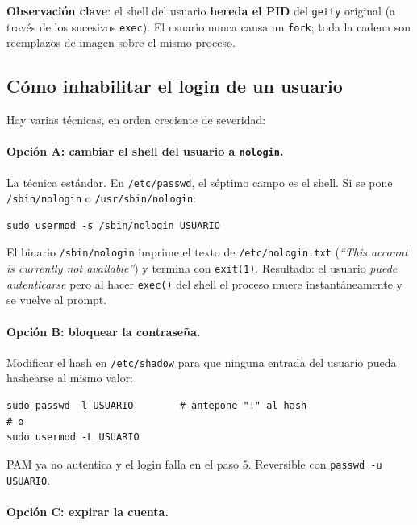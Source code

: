 \documentclass[11pt,a4paper]{article}
\begin{document}
\textbf{Observación clave}: el shell del usuario \textbf{hereda el
PID} del \texttt{getty} original (a través de los sucesivos
\texttt{exec}). El usuario nunca causa un \texttt{fork}; toda la
cadena son reemplazos de imagen sobre el mismo proceso.

\subsection*{Cómo inhabilitar el login de un usuario}

Hay varias técnicas, en orden creciente de severidad:

\paragraph{Opción A: cambiar el shell del usuario a \texttt{nologin}.}
La técnica estándar. En \texttt{/etc/passwd}, el séptimo campo es el
shell. Si se pone \texttt{/sbin/nologin} o \texttt{/usr/sbin/nologin}:

\begin{lstlisting}[style=shellstyle]
sudo usermod -s /sbin/nologin USUARIO
\end{lstlisting}

El binario \texttt{/sbin/nologin} imprime el texto de
\texttt{/etc/nologin.txt} (\emph{``This account is currently not
available''}) y termina con \texttt{exit(1)}. Resultado: el usuario
\emph{puede autenticarse} pero al hacer \texttt{exec()} del shell el
proceso muere instantáneamente y se vuelve al prompt.

\paragraph{Opción B: bloquear la contraseña.}
Modificar el hash en \texttt{/etc/shadow} para que ninguna entrada
del usuario pueda hashearse al mismo valor:

\begin{lstlisting}[style=shellstyle]
sudo passwd -l USUARIO        # antepone "!" al hash
# o
sudo usermod -L USUARIO
\end{lstlisting}

PAM ya no autentica y el login falla en el paso $5$. Reversible con
\texttt{passwd -u USUARIO}.

\paragraph{Opción C: expirar la cuenta.}
\end{document}
